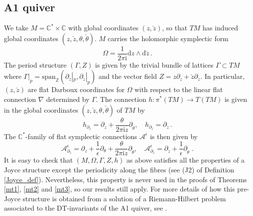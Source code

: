 \documentclass{article}
\theoremstyle{definition}
\numberwithin{equation}{section}
\begin{document}
\subsection{A1 quiver}
We take $M=\mathbb{C}^{*}\times \mathbb{C}$ with global coordinates $(z,\check{z})$, so that $TM$ has induced global coordinates $(z,\check{z},\theta,\check{\theta})$. $M$ carries the holomorphic symplectic form
\begin{equation*}
    \Omega=\frac{1}{2\pi \mathrm{i}}\mathrm{d}z\wedge \mathrm{d}\check{z}\,.
\end{equation*}
The period structure $(\Gamma,Z)$ is given by the trivial bundle of lattices $\Gamma\subset TM$ where $\Gamma|_{p}=\text{span}_{\mathbb{Z}}(\partial_{z}|_p,\partial_{\check{z}}|_p)$ and the vector field $Z=z\partial_z+\check{z}\partial_{\check{z}}$.  In particular, $(z,\check{z})$ are flat Darboux coordinates for $\Omega$ with respect to the linear flat connection $\nabla$ determined by $\Gamma$. The connection $h:\pi^*(TM)\to T(TM)$ is given in the global coordinates $(z,\check{z},\theta,\check{\theta})$ of $TM$ by
\begin{equation*}
    h_{\partial_z}=\partial_z+\frac{\theta}{2\pi \mathrm{i}z}\partial_{\check{\theta}}, \quad h_{\partial_{\check{z}}}=\partial_{\check{z}}\,.
\end{equation*}
The $\mathbb{C}^{*}$-family of flat symplectic connections $\mathcal{A}^{\epsilon}$ is then given by 
\begin{equation}
    \mathcal{A}_{\partial_{z}}^{\epsilon}=\partial_{z}+\frac{1}{\epsilon}\partial_{\theta} +\frac{\theta}{2\pi \mathrm{i}z}\partial_{\check{\theta}}, \quad \mathcal{A}_{\partial_{\check{z}}}^{\epsilon}=\partial_{\check{z}}+\frac{1}{\epsilon}\partial_{\check{\theta}}\,\,.
\end{equation}
It is easy to check that $(M,\Omega,\Gamma,Z,h)$ as above satisfies all the properties of a Joyce structure except the periodicity along the fibres (see (J2) of Definition \ref{Joyce_def}). Nevertheless, this property is never used in the proofs of Theorems \ref{mt1}, \ref{mt2} and \ref{mt3}, so our results still apply. For more details of how this pre-Joyce structure is obtained from a solution of a Riemann-Hilbert problem associated to the DT-invariants of the A1 quiver, see \cite{BridgeJoyce, varBPS}. \\
\end{document}
